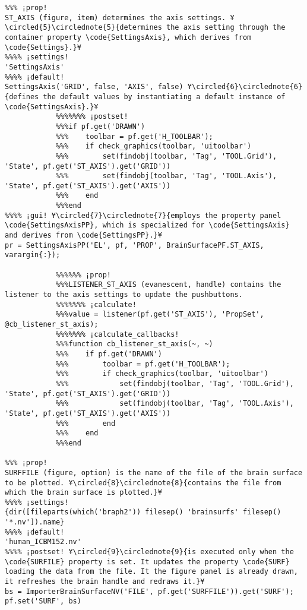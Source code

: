 \documentclass{tufte-handout}
\begin{document}
\begin{lstlisting}
%%% ¡prop!
ST_AXIS (figure, item) determines the axis settings. ¥\circled{5}\circlednote{5}{determines the axis setting through the container property \code{SettingsAxis}, which derives from \code{Settings}.}¥
%%%% ¡settings!
'SettingsAxis'
%%%% ¡default!
SettingsAxis('GRID', false, 'AXIS', false) ¥\circled{6}\circlednote{6}{defines the default values by instantiating a default instance of \code{SettingsAxis}.}¥
            %%%%%%% ¡postset!
            %%%if pf.get('DRAWN')
            %%%    toolbar = pf.get('H_TOOLBAR');
            %%%    if check_graphics(toolbar, 'uitoolbar')
            %%%        set(findobj(toolbar, 'Tag', 'TOOL.Grid'), 'State', pf.get('ST_AXIS').get('GRID'))
            %%%        set(findobj(toolbar, 'Tag', 'TOOL.Axis'), 'State', pf.get('ST_AXIS').get('AXIS'))
            %%%    end
            %%%end
%%%% ¡gui! ¥\circled{7}\circlednote{7}{employs the property panel \code{SettingsAxisPP}, which is specialized for \code{SettingsAxis} and derives from \code{SettingsPP}.}¥
pr = SettingsAxisPP('EL', pf, 'PROP', BrainSurfacePF.ST_AXIS, varargin{:});

            %%%%%% ¡prop!
            %%%LISTENER_ST_AXIS (evanescent, handle) contains the listener to the axis settings to update the pushbuttons.
            %%%%%%% ¡calculate!
            %%%value = listener(pf.get('ST_AXIS'), 'PropSet', @cb_listener_st_axis); 
            %%%%%%% ¡calculate_callbacks!
            %%%function cb_listener_st_axis(~, ~)
            %%%    if pf.get('DRAWN')
            %%%        toolbar = pf.get('H_TOOLBAR');
            %%%        if check_graphics(toolbar, 'uitoolbar')
            %%%            set(findobj(toolbar, 'Tag', 'TOOL.Grid'), 'State', pf.get('ST_AXIS').get('GRID'))
            %%%            set(findobj(toolbar, 'Tag', 'TOOL.Axis'), 'State', pf.get('ST_AXIS').get('AXIS'))
            %%%        end
            %%%    end
            %%%end

%%% ¡prop!
SURFFILE (figure, option) is the name of the file of the brain surface to be plotted. ¥\circled{8}\circlednote{8}{contains the file from which the brain surface is plotted.}¥
%%%% ¡settings!
{dir([fileparts(which('braph2')) filesep() 'brainsurfs' filesep() '*.nv']).name}
%%%% ¡default!
'human_ICBM152.nv'
%%%% ¡postset! ¥\circled{9}\circlednote{9}{is executed only when the \code{SURFILE} property is set. It updates the property \code{SURF} loading the data from the file. It the figure panel is already drawn, it refreshes the brain handle and redraws it.}¥
bs = ImporterBrainSurfaceNV('FILE', pf.get('SURFFILE')).get('SURF');
pf.set('SURF', bs)


\end{lstlisting}
\end{document}

